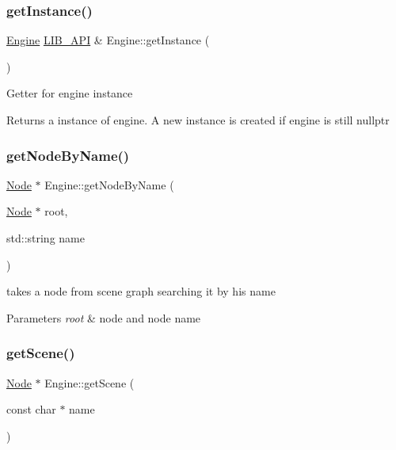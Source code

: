 \subsubsection{\texorpdfstring{get\+Instance()}{getInstance()}}
{\footnotesize\ttfamily \hyperlink{classEngine}{Engine} \hyperlink{Engine_8h_a77278c8cc96e39fb27b5d0a347c8fb3d}{L\+I\+B\+\_\+\+A\+PI} \& Engine\+::get\+Instance (\begin{DoxyParamCaption}{ }\end{DoxyParamCaption})\hspace{0.3cm}{\ttfamily [static]}}

Getter for engine instance \begin{DoxyReturn}{Returns}
a instance of engine. A new instance is created if engine is still nullptr 
\end{DoxyReturn}
\mbox{\label{classEngine_a6897f35a40e6e871ad1badf96f115727}} 
\subsubsection{\texorpdfstring{get\+Node\+By\+Name()}{getNodeByName()}}
{\footnotesize\ttfamily \hyperlink{classNode}{Node} $\ast$ Engine\+::get\+Node\+By\+Name (\begin{DoxyParamCaption}\item[{\hyperlink{classNode}{Node} $\ast$}]{root,  }\item[{std\+::string}]{name }\end{DoxyParamCaption})}

takes a node from scene graph searching it by his name 
\begin{DoxyParams}{Parameters}
{\em root} & node and node name \\
\hline
\end{DoxyParams}
\mbox{\label{classEngine_a0966e5d9a460caedd44b9862aaf6a5f1}} 
\subsubsection{\texorpdfstring{get\+Scene()}{getScene()}}
{\footnotesize\ttfamily \hyperlink{classNode}{Node} $\ast$ Engine\+::get\+Scene (\begin{DoxyParamCaption}\item[{const char $\ast$}]{name }\end{DoxyParamCaption})}

